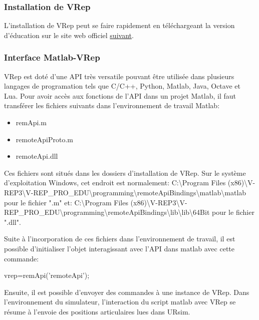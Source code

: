 \documentclass[root.tex]{subfiles}
\begin{document}
\subsubsection{Installation de VRep}

L'installation de VRep peut se faire rapidement en téléchargeant la version d'éducation sur le site web officiel \href{http://www.coppeliarobotics.com/downloads.html}{suivant}.

\subsubsection{Interface Matlab-VRep}

VRep est doté d'une API très versatile pouvant être utilisée dans plusieurs langages de programation tels que C/C++, Python, Matlab, Java, Octave et Lua.
Pour avoir accès aux fonctions de l'API dans un projet Matlab, il faut transférer les fichiers suivants dans l'environnement de travail Matlab:
\begin{itemize}
\item remApi.m
\item remoteApiProto.m
\item remoteApi.dll
\end{itemize}

Ces fichiers sont situés dans les dossiers d'installation de VRep.
Sur le système d'exploitation Windows, cet endroit est normalement: 
\newline
C:\textbackslash Program Files (x86)\textbackslash V-REP3\textbackslash V-REP\_PRO\_EDU\textbackslash programming\textbackslash remoteApiBindings\textbackslash matlab\textbackslash matlab
\newline
pour le fichier ".m" et:
\newline
C:\textbackslash Program Files (x86)\textbackslash V-REP3\textbackslash V-REP\_PRO\_EDU\textbackslash programming\textbackslash remoteApiBindings\textbackslash lib\textbackslash lib\textbackslash 64Bit
\newline
pour le fichier ".dll".
\newline

Suite à l'incorporation de ces fichiers dans l'environnement de travail, il est possible d'initialiser l'objet interagissant avec l'API dans matlab avec cette commande:
\newline

vrep=remApi('remoteApi');
\newline

Ensuite, il est possible d'envoyer des commandes à une instance de VRep.
Dans l'environnement du simulateur, l'interaction du script matlab avec VRep se résume à l'envoie des positions articulaires lues dans URsim.
\end{document}
